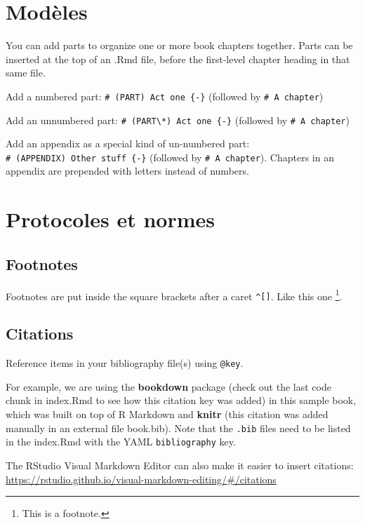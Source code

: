 \documentclass[
]{book}
\theoremstyle{definition}
\theoremstyle{definition}
\theoremstyle{definition}
\theoremstyle{definition}
\theoremstyle{remark}
\begin{document}
\hypertarget{moduxe8les}{%
\chapter{Modèles}\label{moduxe8les}}

You can add parts to organize one or more book chapters together. Parts can be inserted at the top of an .Rmd file, before the first-level chapter heading in that same file.

Add a numbered part: \texttt{\#\ (PART)\ Act\ one\ \{-\}} (followed by \texttt{\#\ A\ chapter})

Add an unnumbered part: \texttt{\#\ (PART\textbackslash{}*)\ Act\ one\ \{-\}} (followed by \texttt{\#\ A\ chapter})

Add an appendix as a special kind of un-numbered part: \texttt{\#\ (APPENDIX)\ Other\ stuff\ \{-\}} (followed by \texttt{\#\ A\ chapter}). Chapters in an appendix are prepended with letters instead of numbers.

\hypertarget{protocoles-et-normes}{%
\chapter{Protocoles et normes}\label{protocoles-et-normes}}

\hypertarget{footnotes}{%
\section{Footnotes}\label{footnotes}}

Footnotes are put inside the square brackets after a caret \texttt{\^{}{[}{]}}. Like this one \footnote{This is a footnote.}.

\hypertarget{citations}{%
\section{Citations}\label{citations}}

Reference items in your bibliography file(s) using \texttt{@key}.

For example, we are using the \textbf{bookdown} package \citep{R-bookdown} (check out the last code chunk in index.Rmd to see how this citation key was added) in this sample book, which was built on top of R Markdown and \textbf{knitr} \citep{xie2015} (this citation was added manually in an external file book.bib).
Note that the \texttt{.bib} files need to be listed in the index.Rmd with the YAML \texttt{bibliography} key.

The RStudio Visual Markdown Editor can also make it easier to insert citations: \url{https://rstudio.github.io/visual-markdown-editing/\#/citations}
\end{document}
